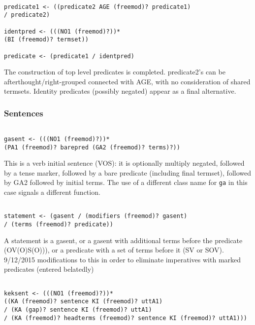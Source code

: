 \documentclass[12pt]{article}
\begin{document}
\begin{verbatim}

predicate1 <- ((predicate2 AGE (freemod)? predicate1) 
/ predicate2)

identpred <- (((NO1 (freemod)?))* 
(BI (freemod)? termset))

predicate <- (predicate1 / identpred)

\end{verbatim}

The construction of top level predicates is completed.  predicate2's can be afterthought/right-grouped connected with AGE, with no consideration of shared termsets.  Identity predicates (possibly negated) appear as a final alternative.

\subsubsection{Sentences}

\begin{verbatim}

gasent <- (((NO1 (freemod)?))* 
(PA1 (freemod)? barepred (GA2 (freemod)? terms)?))

\end{verbatim}

This is a verb initial sentence (VOS):  it is optionally multiply negated, followed by a tense marker, followed by a 
bare predicate (including final termset), followed by GA2 followed by initial terms.  The use of a different class
name for {\tt ga} in this case signals a different function.

\begin{verbatim}

statement <- (gasent / (modifiers (freemod)? gasent) 
/ (terms (freemod)? predicate))

\end{verbatim}

A statement is a gasent, or a gasent with additional terms before the predicate (OV(O)S(O))), or a predicate with a set of terms
before it (SV or SOV).  9/12/2015  modifications to this in order to eliminate imperatives with marked predicates (entered belatedly)

\begin{verbatim}

keksent <- (((NO1 (freemod)?))* 
((KA (freemod)? sentence KI (freemod)? uttA1) 
/ (KA (gap)? sentence KI (freemod)? uttA1) 
/ (KA (freemod)? headterms (freemod)? sentence KI (freemod)? uttA1)))

\end{verbatim}
\end{document}
